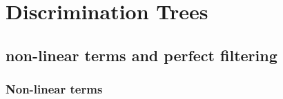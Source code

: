 
\section{Discrimination Trees}

\subsection{non-linear terms and perfect filtering}

\begin{frame}
	\frametitle{Non-linear terms}
	
\end{frame}

\begin{frame}
	
\end{frame}

\begin{frame}
	
\end{frame}